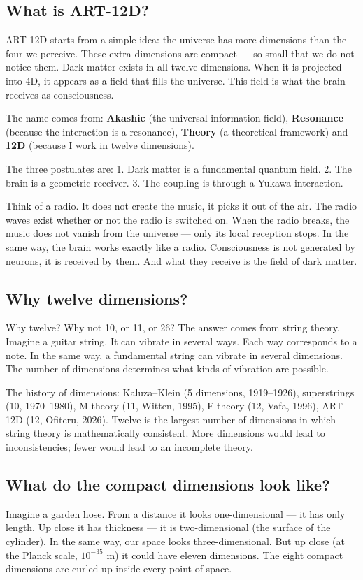 \subsection{What is ART-12D?}
ART-12D starts from a simple idea: the universe has more dimensions than the four we perceive. These extra dimensions are compact --- so small that we do not notice them. Dark matter exists in all twelve dimensions. When it is projected into 4D, it appears as a field that fills the universe. This field is what the brain receives as consciousness.

The name comes from: \textbf{Akashic} (the universal information field), \textbf{Resonance} (because the interaction is a resonance), \textbf{Theory} (a theoretical framework) and \textbf{12D} (because I work in twelve dimensions).

The three postulates are: 1. Dark matter is a fundamental quantum field. 2. The brain is a geometric receiver. 3. The coupling is through a Yukawa interaction.

Think of a radio. It does not create the music, it picks it out of the air. The radio waves exist whether or not the radio is switched on. When the radio breaks, the music does not vanish from the universe --- only its local reception stops. In the same way, the brain works exactly like a radio. Consciousness is not generated by neurons, it is received by them. And what they receive is the field of dark matter.

\subsection{Why twelve dimensions?}
Why twelve? Why not 10, or 11, or 26? The answer comes from string theory. Imagine a guitar string. It can vibrate in several ways. Each way corresponds to a note. In the same way, a fundamental string can vibrate in several dimensions. The number of dimensions determines what kinds of vibration are possible.

The history of dimensions: Kaluza--Klein (5 dimensions, 1919--1926), superstrings (10, 1970--1980), M-theory (11, Witten, 1995), F-theory (12, Vafa, 1996), ART-12D (12, Ofiteru, 2026). Twelve is the largest number of dimensions in which string theory is mathematically consistent. More dimensions would lead to inconsistencies; fewer would lead to an incomplete theory.

\subsection{What do the compact dimensions look like?}
Imagine a garden hose. From a distance it looks one-dimensional --- it has only length. Up close it has thickness --- it is two-dimensional (the surface of the cylinder). In the same way, our space looks three-dimensional. But up close (at the Planck scale, $10^{-35}$ m) it could have eleven dimensions. The eight compact dimensions are curled up inside every point of space.

